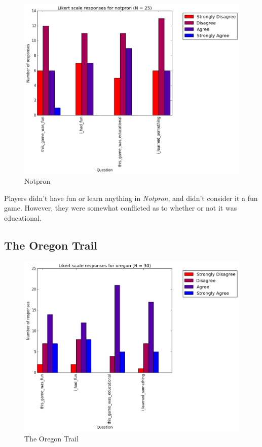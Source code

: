 				\begin{figure}[] 
				\centering 
				\includegraphics[width=\textwidth, height=.4\textheight, keepaspectratio=true]{notpron_likert.png} 
				\caption{Notpron}
				\end{figure}

				Players didn't have fun or learn anything in \textit{Notpron}, and didn't consider it a fun game. However, they were somewhat conflicted as to whether or not it was educational.

			\subsection{The Oregon Trail}

				\begin{figure}[] 
				\centering 
				\includegraphics[width=\textwidth, height=.4\textheight, keepaspectratio=true]{oregon_likert.png} 
				\caption{The Oregon Trail}
				\end{figure}

